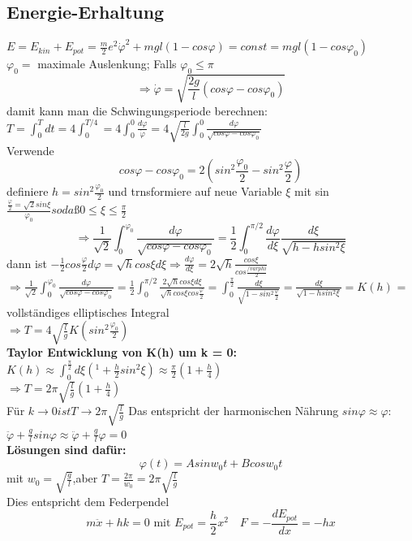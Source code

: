 \documentclass[11pt]{article}
\begin{document}
						\subsection{Energie-Erhaltung}
							\quad$ E = E_{kin} + E_{pot} = \frac{m}{2} e^2 \dot{\varphi}^2 + mgl(1 - cos \varphi)= const = mgl(1 - cos \varphi_0) $\\
							$ \varphi_0 =$ maximale Auslenkung; Falls $\varphi_0 \leq \pi$\\
							\[ \Rightarrow \dot{\varphi} = \sqrt{\frac{2g}{l}(cos \varphi - cos \varphi_0) } \]
							damit kann man die Schwingungsperiode berechnen:\\
							$T = \int_{0}^{T}dt = 4 \int_{0}^{T/4} = 4 \int_{0}^{0} \frac{d\varphi}{\dot{\varphi}} = 4 \sqrt{\frac{l}{2g}} \int_{0}^{0} \frac{d\varphi}{\sqrt{cos \varphi - cos \varphi_0}} $\\
							Verwende 
							\[ cos \varphi - cos \varphi_0 = 2(sin^2\frac{\varphi_0}{2} - sin^2 \frac{\varphi}{2}) \]
							definiere $h = sin^2 \frac{\varphi_0}{2}$ und trnsformiere auf neue Variable $\xi$ mit  sin $\frac{\frac{\varphi}{2} = \sqrt{2} sin \xi}{\varphi_0} so daß 0 \leq \xi \leq \frac{\pi}{2}$
							\[ \Rightarrow \frac{1}{\sqrt{2}} \int_{0}^{\varphi_0} \frac{d\varphi}{\sqrt{cos \varphi - cos \varphi_0}} = \frac{1}{2} \int_{0}^{\pi / 2} \frac{d \varphi}{d \xi} \frac{d \xi}{\sqrt{h - h sin^2\xi}} \]
							dann ist $-\frac{1}{2} cos \frac{\varphi}{2} d\varphi = \sqrt{h} cos \xi d \xi \Rightarrow \frac{d \varphi}{d \xi} = 2 \sqrt{h} \frac{cos \xi}{cos \frac{/varphi}{2}}$\\
							$ \Rightarrow \frac{1}{\sqrt{2}} \int_{0}^{\varphi_0} \frac{d \varphi}{\sqrt{cos \varphi - cos \varphi_0}} = \frac{1}{2} \int_{0}^{\pi/2} \frac{2 \sqrt{h} cos \xi d\xi}{\sqrt{h} cos \xi cos \frac{\varphi}{2}} = \int_{0}^{\frac{\pi}{2}} \frac{d \xi}{\sqrt{1 - sin^2 \frac{\varphi}{2}}} = \frac{d \xi}{\sqrt{1 -h sin^2\xi}} = K(h)$ = vollständiges elliptisches Integral \\
							$ \Rightarrow T= 4 \sqrt{\frac{l}{g}} K(sin^2 \frac{\varphi_0}{2}) $\\
							\textbf{Taylor Entwicklung von K(h) um k = 0:}\\
								$K(h) \approx \int_{0}^{\frac{\pi}{2}} d\xi (^1 + \frac{h}{2} sin^2 \xi) \approx \frac{\pi}{2}(1+\frac{h}{4})$\\
								$ \Rightarrow T = 2\pi \sqrt{\frac{l}{g}}(1 +  \frac{h}{4}) $\\
								Für $k \rightarrow 0 ist T \rightarrow 2\pi \sqrt{\frac{l}{g}}$ Das entspricht der harmonischen Nährung $sin \varphi \approx \varphi$:\\
								$\ddot{\varphi} + \frac{g}{l} sin \varphi \approx \ddot{\varphi} + \frac{g}{l} \varphi = 0 $\\
								\textbf{Lösungen sind dafür:}
									\[ \varphi(t) = A sin w_0 t + B cos w_0 t \]
									mit $w_0 =\sqrt{\frac{g}{l}}$,aber $T = \frac{2 \pi}{w_0} = 2\pi \sqrt{\frac{l}{g}}$\\
									Dies entspricht dem Federpendel
									\[ m \ddot{x} + hk = 0 \text{ mit } E_{pot} = \frac{h}{2}x^2 \quad F = - \frac{d E_{pot}}{dx} = - hx \] 
\end{document}
